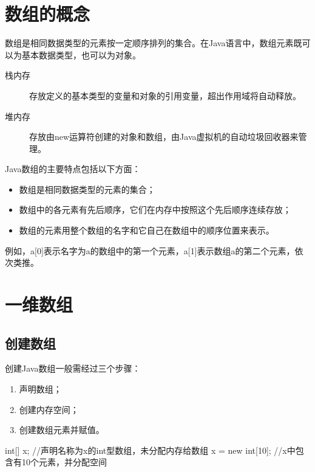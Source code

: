 \section{数组的概念}

数组是相同数据类型的元素按一定顺序排列的集合。在Java语言中，数组元素既可以为基本数据类型，也可以为对象。


\begin{description}
\item [栈内存] 存放定义的基本类型的变量和对象的引用变量，超出作用域将自动释放。
\item [堆内存] 存放由new运算符创建的对象和数组，由Java虚拟机的自动垃圾回收器来管理。
\end{description}

Java数组的主要特点包括以下方面：

\begin{itemize}
\item 数组是相同数据类型的元素的集合；
\item 数组中的各元素有先后顺序，它们在内存中按照这个先后顺序连续存放；
\item 数组的元素用整个数组的名字和它自己在数组中的顺序位置来表示。
\end{itemize}

{\Blue\kai 例如，a[0]表示名字为a的数组中的第一个元素，a[1]表示数组a的第二个元素，依次类推。}

\section{一维数组}

\subsection{创建数组}

创建Java数组一般需经过三个步骤：

\begin{enumerate}
\item 声明数组；
\item 创建内存空间；
\item 创建数组元素并赋值。
\end{enumerate}


\begin{javaCode}
  int[] x;  //声明名称为x的int型数组，未分配内存给数组
  x = new int[10];   //x中包含有10个元素，并分配空间
\end{javaCode}

